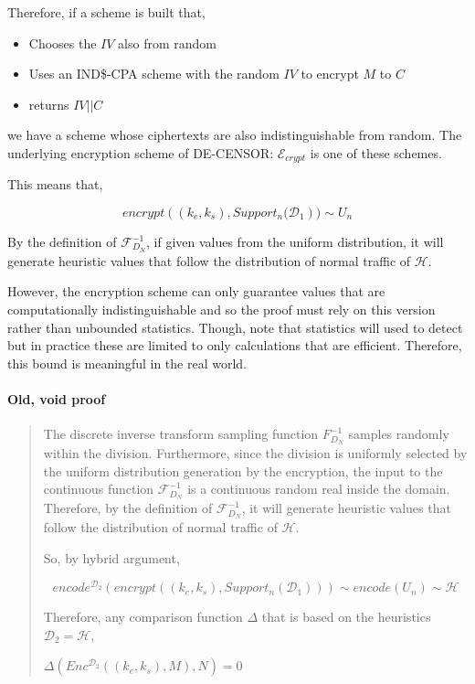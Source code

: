 \documentclass[ %
                    author={Samuel Russell},
                supervisor={Prof. Bogdan Warinschi},
                    degree={MEng},
                     title={Innocuous Ciphertexts},
                  subtitle={The DE-CENSOR Scheme},
                      type={Research},
                      year={2018} ]{dissertation}
\begin{document}
Therefore, if a scheme is built that,
\begin{itemize}
\item Chooses the $IV$ also from random
\item Uses an IND\$-CPA scheme with the random $IV$ to encrypt $M$ to $C$
\item returns $IV || C$
\end{itemize}

we have a scheme whose ciphertexts are also indistinguishable from random.
The underlying encryption scheme of DE-CENSOR: $\mathcal{E}_{crypt}$ is one of these schemes.

This means that,

$$ encrypt \left( (k_e, k_s), Support_n(\mathcal{D}_1 \right) ) \sim  U_n$$


By the definition of $\mathcal{F}^{-1}_{D_N}$, if given values from the uniform distribution, it will generate heuristic values that follow the distribution of normal traffic of $\mathcal{H}$.

However, the encryption scheme can only guarantee values that are computationally indistinguishable and so the proof must rely on this version rather than unbounded statistics.
Though, note that statistics will used to detect but in practice these are limited to only calculations that are efficient.
Therefore, this bound is meaningful in the real world.



\paragraph{Old, void proof}
\begin{quote}
The discrete inverse transform sampling function $F^{-1}_{D_N}$ samples randomly within the division.
Furthermore, since the division is uniformly selected by the uniform distribution generation by the encryption, the input to the continuous function $\mathcal{F}^{-1}_{D_N}$ is a continuous random real inside the domain.
Therefore, by the definition of $\mathcal{F}^{-1}_{D_N}$, it will generate heuristic values that follow the distribution of normal traffic of $\mathcal{H}$.

So, by hybrid argument,

$$ encode^{\mathcal{D}_2} \left( encrypt \left( (k_e, k_s), Support_n(\mathcal{D}_1) \right) \right) \sim  encode \left( U_n \right) \sim \mathcal{H}$$

Therefore, any comparison function $\Delta$ that is based on the heuristics $\mathcal{D}_2 = \mathcal{H}$,

$\Delta \left(  Enc^{\mathcal{D}_2}((k_e,k_s), M), N  \right) = 0$

\end{quote}
\end{document}
